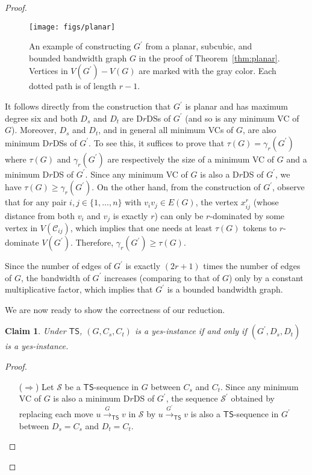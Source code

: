\documentclass[a4paper]{article}
\theoremstyle{plain}
\newtheorem{claim}{Claim}[theorem]
\theoremstyle{definition}
\newcommand{\sfTS}{{\mathsf{TS}}} %
\newcommand{\sfR}{{\mathsf{R}}} %
\newcommand{\calS}{{\mathcal{S}}}
\newcommand{\reconf}[2][\sfR]{\overset{#2}{\longrightarrow}_{#1}} %
\begin{document}
\begin{proof}
	\begin{figure}[ht]
		\centering
		\texttt{[image: figs/planar]}
		\caption{An example of constructing $G^\prime$ from a planar, subcubic, and bounded bandwidth graph $G$ in the proof of Theorem~\ref{thm:planar}. Vertices in $V(G^\prime) - V(G)$ are marked with the gray color. Each dotted path is of length $r-1$.}
		\label{fig:planar}
	\end{figure}
	
	It follows directly from the construction that $G^\prime$ is planar and has maximum degree six and both $D_s$ and $D_t$ are D$r$DSs of $G^\prime$ (and so is any minimum VC of $G$).
	Moreover, $D_s$ and $D_t$, and in general all minimum VCs of $G$, are also minimum D$r$DSs of $G^\prime$.
	To see this, it suffices to prove that $\tau(G) = \gamma_r(G^\prime)$ where $\tau(G)$ and $\gamma_r(G^\prime)$ are respectively the size of a minimum VC of $G$ and a minimum D$r$DS of $G^\prime$.
	Since any minimum VC of $G$ is also a D$r$DS of $G^\prime$, we have $\tau(G) \geq \gamma_r(G^\prime)$.
	On the other hand, from the construction of $G^\prime$, observe that for any pair $i, j \in \{1, \dots, n\}$ with $v_iv_j \in E(G)$, the vertex $x_{ij}^r$ (whose distance from both $v_i$ and $v_j$ is exactly $r$) can only be $r$-dominated by some vertex in $V(\mathcal{C}_{ij})$, which implies that one needs at least $\tau(G)$ tokens to $r$-dominate $V(G^\prime)$.
	Therefore, $\gamma_r(G^\prime) \geq \tau(G)$.
	
	Since the number of edges of $G^\prime$ is exactly $(2r+1)$ times the number of edges of $G$, the bandwidth of $G^\prime$ increases (comparing to that of $G$) only by a constant multiplicative factor, which implies that $G^\prime$ is a bounded bandwidth graph.
	
	We are now ready to show the correctness of our reduction.
	\begin{claim}\label{clm:TS-planar}
		Under $\sfTS$, $(G, C_s, C_t)$  is a yes-instance if and only if $(G^\prime, D_s, D_t)$ is a yes-instance.
	\end{claim}
	\begin{proof}
		\begin{itemize}
			\item[($\Rightarrow$)] Let $\calS$ be a $\sfTS$-sequence in $G$ between $C_s$ and $C_t$.
			Since any minimum VC of $G$ is also a minimum D$r$DS of $G^\prime$, the sequence $\calS^\prime$ obtained by replacing each move $u \reconf[\sfTS]{G} v$ in $\calS$ by $u \reconf[\sfTS]{G^\prime} v$ is also a $\sfTS$-sequence in $G^\prime$ between $D_s = C_s$ and $D_t = C_t$.
			

\end{itemize}
\end{proof}
\end{proof}
\end{document}
